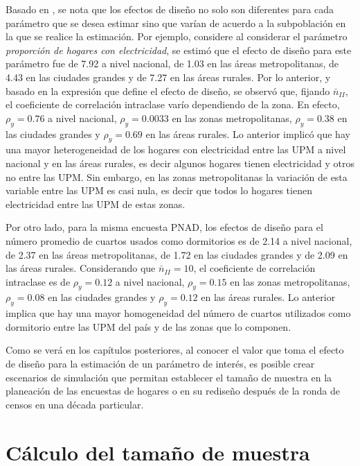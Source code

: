 \documentclass[
  12pt,
  spanish,
]{book}
\begin{document}
Basado en \citet[capítulo 7]{United_Nations_2005}, se nota que los efectos de diseño no solo son diferentes para cada parámetro que se desea estimar sino que varían de acuerdo a la subpoblación en la que se realice la estimación. Por ejemplo, considere al considerar el parámetro \emph{proporción de hogares con electricidad}, se estimó que el efecto de diseño para este parámetro fue de 7.92 a nivel nacional, de 1.03 en las áreas metropolitanas, de 4.43 en las ciudades grandes y de 7.27 en las áreas rurales. Por lo anterior, y basado en la expresión que define el efecto de diseño, se observó que, fijando \(\bar{n}_{II}\), el coeficiente de correlación intraclase varío dependiendo de la zona. En efecto, \(\rho_y= 0.76\) a nivel nacional, \(\rho_y= 0.0033\) en las zonas metropolitanas, \(\rho_y= 0.38\) en las ciudades grandes y \(\rho_y= 0.69\) en las áreas rurales. Lo anterior implicó que hay una mayor heterogeneidad de los hogares con electricidad entre las UPM a nivel nacional y en las áreas rurales, es decir algunos hogares tienen electricidad y otros no entre las UPM. Sin embargo, en las zonas metropolitanas la variación de esta variable entre las UPM es casi nula, es decir que todos lo hogares tienen electricidad entre las UPM de estas zonas.

Por otro lado, para la misma encuesta PNAD, los efectos de diseño para el número promedio de cuartos usados como dormitorios es de 2.14 a nivel nacional, de 2.37 en las áreas metropolitanas, de 1.72 en las ciudades grandes y de 2.09 en las áreas rurales. Considerando que \(\bar{n}_{II}=10\), el coeficiente de correlación intraclase es de \(\rho_y= 0.12\) a nivel nacional, \(\rho_y= 0.15\) en las zonas metropolitanas, \(\rho_y= 0.08\) en las ciudades grandes y \(\rho_y= 0.12\) en las áreas rurales. Lo anterior implica que hay una mayor homogeneidad del número de cuartos utilizados como dormitorio entre las UPM del país y de las zonas que lo componen.

Como se verá en los capítulos posteriores, al conocer el valor que toma el efecto de diseño para la estimación de un parámetro de interés, es posible crear escenarios de simulación que permitan establecer el tamaño de muestra en la planeación de las encuestas de hogares o en su rediseño después de la ronda de censos en una década particular.

\hypertarget{cuxe1lculo-del-tamauxf1o-de-muestra}{%
\chapter{Cálculo del tamaño de muestra}\label{cuxe1lculo-del-tamauxf1o-de-muestra}}
\end{document}
